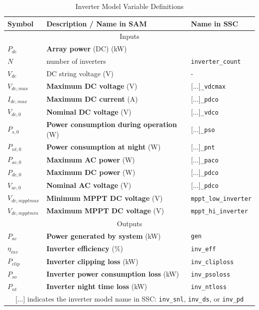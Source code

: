 \documentclass[12pt,letterpaper]{article}
\begin{document}
\begin{table}
\begin{center}
\caption{Inverter Model Variable Definitions}
\begin{tabular}{lll}
\midrule
Symbol & Description / \textbf{Name in SAM} & Name in SSC\\
\midrule
\multicolumn{3}{c}{Inputs}\\
$P_{dc}$ & \textbf{Array power} (DC) (kW)& \\
$N$ & number of inverters & \texttt{inverter\_count} \\
$V_{dc}$ & DC string voltage (V)& - \\
$V_{dc,max}$ & \textbf{Maximum DC voltage} (V)& [...]\texttt{\_vdcmax} \\
$I_{dc,max}$ & \textbf{Maximum DC current} (A) &  [...]\texttt{\_pdco} \\
$V_{dc,0}$ & \textbf{Nominal DC voltage} (V)&  [...]\texttt{\_vdco} \\
$P_{s,0}$ & \textbf{Power consumption during operation} (W)&  [...]\texttt{\_pso} \\
$P_{nt,0}$ & \textbf{Power consumption at night} (W)&  [...]\texttt{\_pnt} \\
$P_{ac,0}$ & \textbf{Maximum AC power} (W)&  [...]\texttt{\_paco} \\
$P_{dc,0}$ & \textbf{Maximum DC power} (W) &  [...]\texttt{\_pdco} \\
$V_{ac,0}$ & \textbf{Nominal AC voltage} (V) &  [...]\texttt{\_pdco} \\
$V_{dc,mppt max}$ & \textbf{Minimum MPPT DC voltage} (V) &  \texttt{mppt\_low\_inverter} \\
$V_{dc,mppt min}$ & \textbf{Maximum MPPT DC voltage} (V) &  \texttt{mppt\_hi\_inverter} \\
\midrule
\multicolumn{3}{c}{Outputs}\\
$P_{ac}$ & \textbf{Power generated by system} (kW) & \texttt{gen} \\
$\eta_{inv}$ & \textbf{Inverter efficiency} (\%)& \texttt{inv\_eff}  \\
$P_{clip}$ & \textbf{Inverter clipping loss} (kW)& \texttt{inv\_cliploss}  \\
$P_{so}$ & \textbf{Inverter power consumption loss} (kW)& \texttt{inv\_psoloss}  \\
$P_{nt}$ & \textbf{Inverter night time loss} (kW)& \texttt{inv\_ntloss}  \\
\midrule
\multicolumn{3}{c}{[...] indicates the inverter model name in SSC: \texttt{inv\_snl}, \texttt{inv\_ds}, or \texttt{inv\_pd} }\\

\end{tabular}
\label{tab-invertervars}
\end{center}
\end{table}
\end{document}
